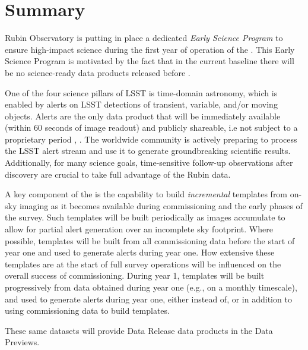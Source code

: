 \section{Summary}

Rubin Observatory is putting in place a dedicated {\it Early Science Program} to ensure high-impact science during the first year of operation of the \lsst.
This Early Science Program is motivated by the fact that in the current baseline there will be no science-ready data products released before \drone. 

One of the four science pillars of LSST is time-domain astronomy, which is enabled by alerts on LSST detections of transient, variable, and/or moving objects. 
Alerts are the only data product that will be immediately available (within 60 seconds of image readout) and publicly shareable, i.e not subject to a proprietary period \citep{LSE-163},  \citep{RDO-013}. 
The worldwide community is actively preparing to process the LSST alert stream and use it to generate groundbreaking scientific results. Additionally, for many science goals, time-sensitive follow-up observations after discovery are crucial to take full advantage of the Rubin data. 

A key component of the \esp is the capability to build {\it incremental} templates from on-sky imaging as it becomes available during commissioning and the early phases of the survey. 
Such templates will be built periodically as images accumulate to allow for partial alert generation over an incomplete sky footprint.
Where possible, templates will be built from all commissioning data before the start of year one and used to generate alerts during year one.
How extensive these templates are at the start of full survey operations will be influenced on the overall success of commissioning.
During year 1, templates will be built progressively from data obtained during year one (e.g., on a monthly timescale), and used to generate alerts during year one, either instead of, or in addition to using commissioning data to build templates.

These same datasets will provide Data Release data products in the Data Previews. 